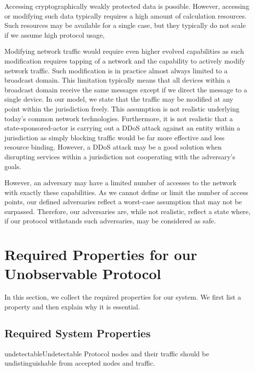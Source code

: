 Accessing cryptographically weakly protected data is possible. However, accessing or modifying such data typically requires a high amount of calculation resources. Such resources may be available for a single case, but they typically do not scale if we assume high protocol usage,

Modifying network traffic would require even higher evolved capabilities as such modification requires tapping of a network and the capability to actively modify network traffic. Such modification is in practice almost always limited to a broadcast domain. This limitation typically means that all devices within a broadcast domain receive the same messages except if we direct the message to a single device. In our model, we state that the traffic may be modified at any point within the jurisdiction freely. This assumption is not realistic underlying today's common network technologies.
Furthermore, it is not realistic that a state-sponsored-actor is carrying out a DDoS attack against an entity within a jurisdiction as simply blocking traffic would be far more effective and less resource binding. However, a DDoS attack may be a good solution when disrupting services within a jurisdiction not cooperating with the adversary's goals.

However, an adversary may have a limited number of accesses to the network with exactly these capabilities. As we cannot define or limit the number of access points, our defined adversaries reflect a worst-case assumption that may not be surpassed. Therefore, our adversaries are, while not realistic, reflect a state where, if our protocol withstands such adversaries, may be considered as safe.

\section{Required Properties for our Unobservable Protocol}\label{sec:properties}
In this section, we collect the required properties for our system. We first list a property and then explain why it is essential.

\subsection{Required System Properties}\label{sec:requirements}

\begin{requirement}{undetectable}{Undetectable}
	Protocol nodes and their traffic should be undistinguishable from accepted nodes and traffic. 
\end{requirement}

